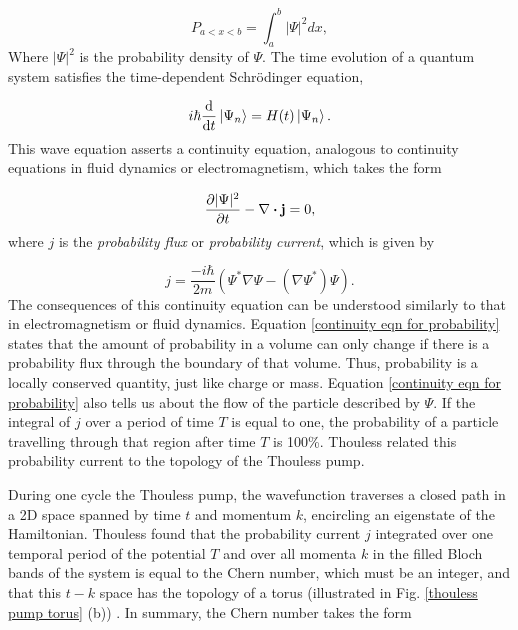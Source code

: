\documentclass[double,12pt,1in]{beavtex}
\begin{document}
\begin{equation}
    P_{a<x<b} = \int_{a}^{b} |\Psi|^2dx,
\end{equation}
Where $|\Psi|^2$ is the probability density of $\Psi$. The time evolution of a quantum system satisfies the time-dependent Schrödinger equation,

\begin{equation}
    i \hbar \derivative{t}\ket{\Psi_n} = H(t)\ket{\Psi_n}.
\end{equation}
This wave equation asserts a continuity equation, analogous to continuity equations in fluid dynamics or electromagnetism, which takes the form \cite{sakurai_modern_1985}

\begin{equation}
    \pdv{|\Psi|^2}{t} -\nabla \dotproduct \vectorbold{j} = 0, \label{continuity eqn for probability}
\end{equation}
where $j$ is the \textit{probability flux} or \textit{probability current}, which is given by

\begin{equation}
    j = \frac{-i \hbar}{2 m}\left(\Psi^* \nabla \Psi - (\nabla \Psi^*)\Psi\right). 
\end{equation}
The consequences of this continuity equation can be understood similarly to that in electromagnetism or fluid dynamics. Equation \ref{continuity eqn for probability} states that the amount of probability in a volume can only change if there is a probability flux through the boundary of that volume. Thus, probability is a locally conserved quantity, just like charge or mass. Equation \ref{continuity eqn for probability} also tells us about the flow of the particle described by $\Psi$. If the integral of $j$ over a period of time $T$ is equal to one, the probability of a particle travelling through that region after time $T$ is 100\%. Thouless related this probability current to the topology of the Thouless pump.

During one cycle the Thouless pump, the wavefunction traverses a closed path in a 2D space spanned by time $t$ and momentum $k$, encircling an eigenstate of the Hamiltonian. Thouless found that the probability current $j$ integrated over one temporal period of the potential $T$ and over all momenta $k$ in the filled Bloch bands of the system is equal to the Chern number, which must be an integer, and that this $t-k$ space has the topology of a torus (illustrated in Fig. \ref{thouless pump torus} (b)) \cite{thouless_quantization_1983}. In summary, the Chern number takes the form
\end{document}
